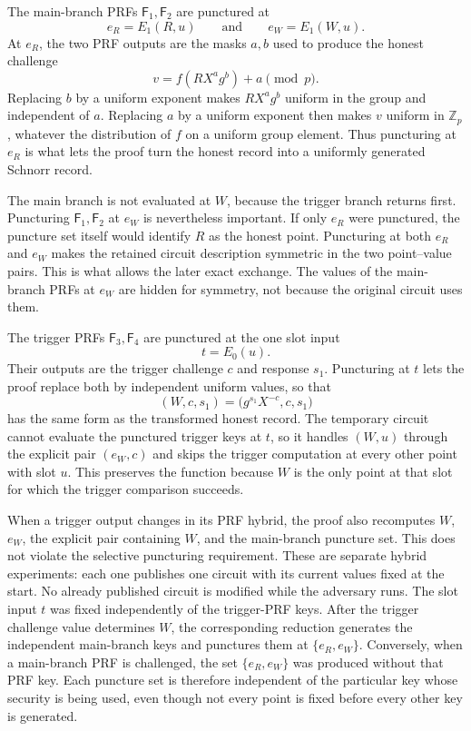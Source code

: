 \documentclass[11pt]{article}
\newcommand{\Zp}{\mathbb{Z}_p}
\begin{document}
The main-branch PRFs \(\mathsf{F}_1,\mathsf{F}_2\) are punctured at
\[
  e_R=E_1(R,u)
  \qquad\text{and}\qquad
  e_W=E_1(W,u).
\]
At \(e_R\), the two PRF outputs are the masks \(a,b\) used to produce the
honest challenge
\[
  v=f(RX^ag^b)+a\pmod p.
\]
Replacing \(b\) by a uniform exponent makes \(RX^ag^b\) uniform in the group
and independent of \(a\).  Replacing \(a\) by a uniform exponent then makes
\(v\) uniform in \(\Zp\), whatever the distribution of \(f\) on a uniform
group element.  Thus puncturing at \(e_R\) is what lets the proof turn the
honest record into a uniformly generated Schnorr record.

The main branch is not evaluated at \(W\), because the trigger branch returns
first.  Puncturing \(\mathsf{F}_1,\mathsf{F}_2\) at \(e_W\) is nevertheless
important.  If only \(e_R\) were punctured, the puncture set itself would
identify \(R\) as the honest point.  Puncturing at both \(e_R\) and \(e_W\)
makes the retained circuit description symmetric in the two point--value
pairs.  This is what allows the later exact exchange.  The values of the
main-branch PRFs at \(e_W\) are hidden for symmetry, not because the original
circuit uses them.

The trigger PRFs \(\mathsf{F}_3,\mathsf{F}_4\) are punctured at the one slot
input
\[
  t=E_0(u).
\]
Their outputs are the trigger challenge \(c\) and response \(s_1\).
Puncturing at \(t\) lets the proof replace both by independent uniform
values, so that
\[
  (W,c,s_1)=\bigl(g^{s_1}X^{-c},c,s_1\bigr)
\]
has the same form as the transformed honest record.  The temporary circuit
cannot evaluate the punctured trigger keys at \(t\), so it handles
\((W,u)\) through the explicit pair \((e_W,c)\) and skips the trigger
computation at every other point with slot \(u\).  This preserves the
function because \(W\) is the only point at that slot for which the trigger
comparison succeeds.

When a trigger output changes in its PRF hybrid, the proof also recomputes
\(W\), \(e_W\), the explicit pair containing \(W\), and the main-branch
puncture set.  This does not violate the selective puncturing requirement.
These are separate hybrid experiments: each one publishes one circuit with
its current values fixed at the start.  No already published circuit is
modified while the adversary runs.
The slot input \(t\) was fixed independently of the trigger-PRF keys.  After
the trigger challenge value determines \(W\), the corresponding reduction
generates the independent main-branch keys and punctures them at
\(\{e_R,e_W\}\).  Conversely, when a main-branch PRF is challenged, the set
\(\{e_R,e_W\}\) was produced without that PRF key.  Each puncture set is
therefore independent of the particular key whose security is being used,
even though not every point is fixed before every other key is generated.
\end{document}
